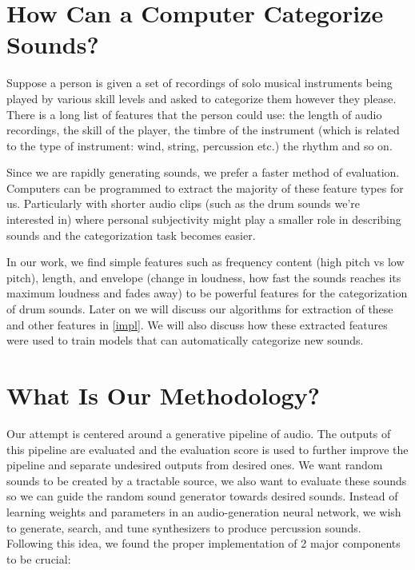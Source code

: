 \documentclass[\main/thesis.tex]{subfiles}
\begin{document}
 
 
 
 

\section{How Can a Computer Categorize Sounds?}

Suppose a person is given a set of recordings of solo musical instruments being played by various skill levels and asked to categorize them however they please. There is a long list of features that the person could use: the length of audio recordings, the skill of the player, the timbre of the instrument (which is related to the type of instrument: wind, string, percussion etc.) the rhythm and so on. 

Since we are rapidly generating sounds, we prefer a faster method of evaluation. Computers can be programmed to extract the majority of these feature types for us. Particularly with shorter audio clips (such as the drum sounds we're interested in) where personal subjectivity might play a smaller role in describing sounds and the categorization task becomes easier. 

In our work, we find simple features such as frequency content (high pitch vs low pitch), length, and envelope (change in loudness, how fast the sounds reaches its maximum loudness and fades away) to be powerful features for the categorization of drum sounds. Later on we will discuss our algorithms for extraction of these and other features in \ref{impl}. We will also discuss how these extracted features were used to train models that can automatically categorize new sounds. 

\section{What Is Our Methodology?}

Our attempt is centered around a generative pipeline of audio. The outputs of this pipeline are evaluated and the evaluation score is used to further improve the pipeline and separate undesired outputs from desired ones. We want random sounds to be created by a tractable source, we also want to evaluate these sounds so we can guide the random sound generator towards desired sounds. Instead of learning weights and parameters in an audio-generation neural network, we wish to generate, search, and tune synthesizers to produce percussion sounds. Following this idea, we found the proper implementation of 2 major components to be crucial:
\end{document}
